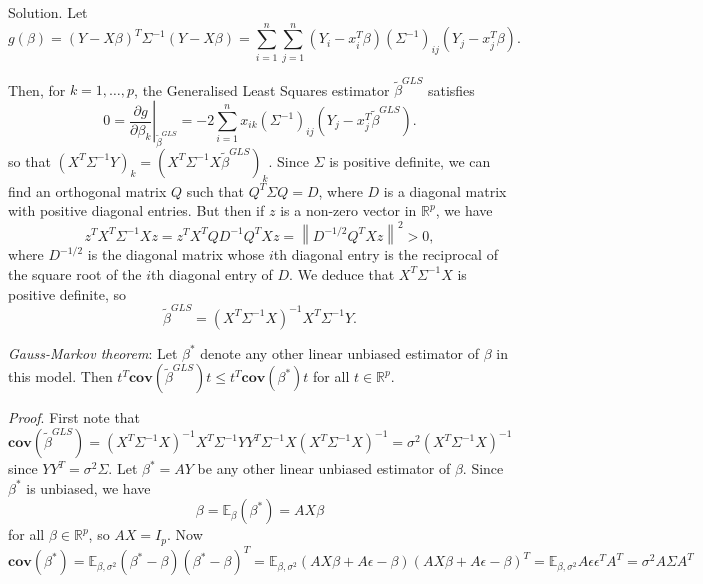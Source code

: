 Solution. Let
\begin{equation}
g(\beta)=(Y-X\beta)^T\Sigma^{-1}(Y-X\beta) = \sum^n_{i=1}\sum^n_{j=1}(Y_i-x_i^T\beta)(\Sigma^{-1})_{ij}(Y_j-x_j^T\beta).
\end{equation}

Then, for $k=1,\dots,p$, the Generalised Least Squares estimator $\tilde{\beta}^{GLS}$ satisfies
\begin{equation}
0 = \left.\frac{\partial g}{\partial \beta_k}\right|_{\tilde{\beta}^{GLS}}= -2 \sum^n_{i=1}x_{ik}(\Sigma^{-1})_{ij}(Y_j-x_j^T\tilde{\beta}^{GLS}).
\end{equation}
so that $(X^T\Sigma^{-1}Y)_k= (X^T\Sigma^{-1}X\tilde{\beta}^{GLS})_k$. Since $\Sigma$ is positive definite, we can find an orthogonal matrix $Q$ such that $Q^T\Sigma Q=D$, where $D$ is a diagonal matrix with positive diagonal entries. But then if $z$ is a non-zero vector in $\mathbb{R}^p$, we have
\begin{equation}
z^TX^T\Sigma^{-1}Xz = z^TX^TQD^{-1}Q^TXz = \left\|D^{-1/2}Q^TXz\right\|^2>0,
\end{equation}
where $D^{-1/2}$ is the diagonal matrix whose $i$th diagonal entry is the reciprocal of the square root of the $i$th diagonal entry of $D$. We deduce that $X^T\Sigma^{-1}X$ is positive definite, so
\begin{equation}
\tilde{\beta}^{GLS}=(X^T\Sigma^{-1}X)^{-1}X^T\Sigma^{-1}Y.
\end{equation}

\emph{Gauss-Markov theorem}: Let $\beta^*$ denote any other linear unbiased estimator of $\beta$ in this model. Then $t^T\mathbf{cov}(\tilde{\beta}^{GLS})t\leq t^T\mathbf{cov}(\beta^*)t$ for all $t\in\mathbb{R}^p$.

\emph{Proof}. First note that
\begin{equation}
\mathbf{cov}(\tilde{\beta}^{GLS})=(X^T\Sigma^{-1}X)^{-1}X^T\Sigma^{-1}YY^T\Sigma^{-1}X(X^T\Sigma^{-1}X)^{-1} = \sigma^2(X^T\Sigma^{-1}X)^{-1}
\end{equation}
since $YY^T= \sigma^2\Sigma $. Let $\beta^*=AY$ be any other linear unbiased estimator of $\beta$. Since $\beta^*$ is unbiased, we have
\begin{equation}
\beta = \mathbb{E}_{\beta}(\beta^*) = AX\beta
\end{equation}
for all $\beta\in\mathbb{R}^p$, so $AX=I_p$. Now
\begin{equation}
\mathbf{cov}(\beta^*) = \mathbb{E}_{\beta,\sigma^2}(\beta^*-\beta)(\beta^*-\beta)^T = \mathbb{E}_{\beta,\sigma^2}(AX\beta + A\epsilon -\beta)(AX\beta + A\epsilon -\beta)^T = \mathbb{E}_{\beta,\sigma^2}A\epsilon\epsilon^TA^T= \sigma^2A\Sigma A^T
\end{equation}

